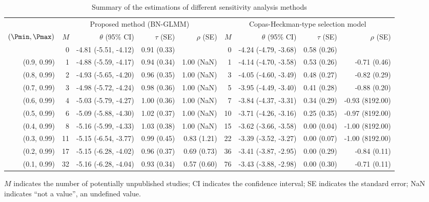 \begin{table}

\caption{\label{tab:tab}Summary of the estimations of different sensitivity analysis methods}
\centering
\begin{threeparttable}
\begin{tabular}[t]{rrrrrrrrr}
\toprule
\multicolumn{1}{c}{} & \multicolumn{4}{c}{Proposed method (BN-GLMM)} & \multicolumn{4}{c}{Copas-Heckman-type selection model} \\
\cmidrule(l{3pt}r{3pt}){2-5} \cmidrule(l{3pt}r{3pt}){6-9}
$(\Pmin, \Pmax)$ & $M$ & $\theta$ (95\% CI) & $\tau$ (SE) & $\rho$ (SE) & $M$ & $\theta$ (95\% CI) & $\tau$ (SE) & $\rho$ (SE)\\
\midrule
 & 0 & -4.81 (-5.51, -4.12) & 0.91 (0.33) &  & 0 & -4.24 (-4.79, -3.68) & 0.58 (0.26) & \\
(0.9, 0.99) & 1 & -4.88 (-5.59, -4.17) & 0.94 (0.34) & 1.00 (NaN) & 1 & -4.14 (-4.70, -3.58) & 0.53 (0.26) & -0.71 (0.46)\\
(0.8, 0.99) & 2 & -4.93 (-5.65, -4.20) & 0.96 (0.35) & 1.00 (NaN) & 3 & -4.05 (-4.60, -3.49) & 0.48 (0.27) & -0.82 (0.29)\\
(0.7, 0.99) & 3 & -4.98 (-5.72, -4.24) & 0.98 (0.36) & 1.00 (NaN) & 5 & -3.95 (-4.49, -3.40) & 0.41 (0.28) & -0.88 (0.20)\\
(0.6, 0.99) & 4 & -5.03 (-5.79, -4.27) & 1.00 (0.36) & 1.00 (NaN) & 7 & -3.84 (-4.37, -3.31) & 0.34 (0.29) & -0.93 (8192.00)\\
(0.5, 0.99) & 6 & -5.09 (-5.88, -4.30) & 1.02 (0.37) & 1.00 (NaN) & 10 & -3.71 (-4.26, -3.16) & 0.25 (0.35) & -0.97 (8192.00)\\
(0.4, 0.99) & 8 & -5.16 (-5.99, -4.33) & 1.03 (0.38) & 1.00 (NaN) & 15 & -3.62 (-3.66, -3.58) & 0.00 (0.04) & -1.00 (8192.00)\\
(0.3, 0.99) & 11 & -5.15 (-6.54, -3.77) & 0.99 (0.45) & 0.83 (1.21) & 22 & -3.39 (-3.52, -3.27) & 0.00 (0.07) & -1.00 (8192.00)\\
(0.2, 0.99) & 17 & -5.15 (-6.28, -4.02) & 0.96 (0.37) & 0.69 (0.73) & 36 & -3.41 (-3.87, -2.95) & 0.00 (0.29) & -0.84 (0.11)\\
(0.1, 0.99) & 32 & -5.16 (-6.28, -4.04) & 0.93 (0.34) & 0.57 (0.60) & 76 & -3.43 (-3.88, -2.98) & 0.00 (0.30) & -0.71 (0.11)\\
\bottomrule
\end{tabular}
\begin{tablenotes}
\item $M$ indicates the number of potentially unpublished studies; 
           CI indicates the confidence interval; 
           SE indicates the standard error;
           NaN indicates ``not a value'', an undefined value.
\end{tablenotes}
\end{threeparttable}
\end{table}
